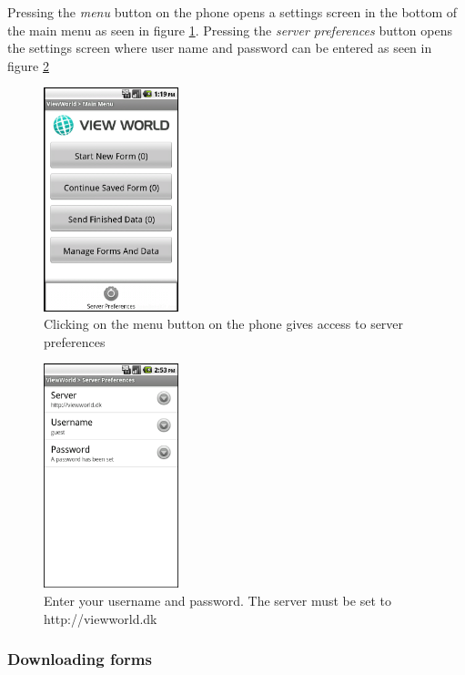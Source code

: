 \documentclass[a4paper, 12pt, final]{article}
\begin{document}
Pressing the \emph{menu} button on the phone opens a settings screen in the bottom of the main menu as seen in figure \ref{fig:server_prefs_1}. Pressing the \emph{server preferences} button opens the settings screen where user name and password can be entered as seen in figure \ref{fig:server_prefs_2}

\begin{figure}[h!]
  \centering
      \includegraphics[width=0.35\textwidth]{pics/vw_server_pref_1.png}
  \caption{Clicking on the menu button on the phone gives access to server preferences}
  \label{fig:server_prefs_1}
\end{figure}

\begin{figure}[h!]
  \centering
      \includegraphics[width=0.35\textwidth]{pics/vw_server_pref_2.png}
  \caption{Enter your username and password. The server must be set to http://viewworld.dk}
  \label{fig:server_prefs_2}
\end{figure}

\subsubsection{Downloading forms}
\end{document}
